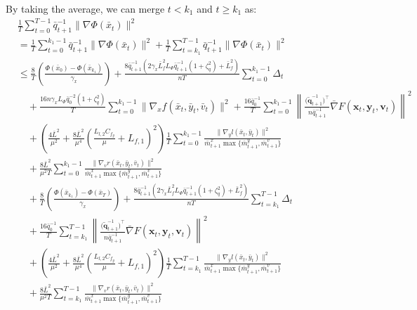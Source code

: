 \documentclass{article}
\theoremstyle{plain}
\theoremstyle{definition}
\theoremstyle{remark}
\begin{document}
By taking the average, we can merge $t < k_1$ and $t \geq k_1$ as:
\begin{align}
&\frac{1}{T} \sum_{t=0}^{T-1} { \bar{q}_{t+1}^{-1}}\|\nabla \Phi(\bar{x}_t)\|^2\nonumber\\
&= \frac{1}{T} \sum_{t=0}^{k_1-1} {\bar{q}_{t+1}^{-1}}\|\nabla \Phi(\bar{x}_t)\|^2
+ \frac{1}{T} \sum_{t=k_1}^{T-1} {\bar{q}_{t+1}^{-1}}\|\nabla \Phi(\bar{x}_t)\|^2\nonumber \\
&\leq \frac{8}{T}\left(\frac{\Phi(\bar{x}_0)-\Phi(\bar{x}_{k_1})}{\gamma_x}\right)+\frac{8\bar{q}_{t+1}^{-1}(2\gamma_x \bar{L}_{f}^2L_\Phi \bar{q}_{t+1}^{-1} \left(1 +\zeta_q^2\right)+\bar{L}_{f}^2)}{nT} \sum_{t=0}^{k_1-1}\Delta_t\nonumber\\
&\quad +\frac{16n\gamma_x L_\Phi \bar{q}_{0}^{-2} \left(1 +\zeta_q^2\right)}{T}\sum_{t=0}^{k_1-1}\|\nabla_x f(\bar{x}_t, \bar{y}_t, \bar{v}_t)\|^2
+ \frac{16\bar{q}_{0}^{-1}}{T}\sum_{t=0}^{k_1-1} \left\| \frac{\big(\tilde{\mathbf{q}}_{t+1}^{-1}\big)^\top}{n\bar{q}_{t+1}^{-1}} \bar{\nabla} F(\mathbf{x}_t, \mathbf{y}_t, \mathbf{v}_t) \right\|^2 \nonumber \\
&\quad +\left( \frac{4\bar{L}^2}{\mu^2} + \frac{8\bar{L}^2}{\mu^4} \left( \frac{L_{l,2} C_{f_y}}{\mu} + L_{f,1} \right)^2 \right) \frac{1}{T}\sum_{t=0}^{k_1-1}\frac{\|\nabla_y l(\bar{x}_t, \bar{y}_t)\|^2}{\bar{m}^x_{t+1}\max\{\bar{m}^y_{t+1},\bar{m}^v_{t+1}\}}\nonumber\\
&\quad+ \frac{8\bar{L}^2 }{\mu^2T}\sum_{t=0}^{k_1-1}\frac{\|\nabla_v r(\bar{x}_t, \bar{y}_t, \bar{v}_t)\|^2}{\bar{m}^x_{t+1}\max\{\bar{m}^y_{t+1},\bar{m}^v_{t+1}\}}\nonumber\\
&\quad+ \frac{8}{T}\left(\frac{\Phi(\bar{x}_{k_1})-\Phi(\bar{x}_{T})}{\gamma_x}\right)+\frac{8\bar{q}_{t+1}^{-1}(2\gamma_x \bar{L}_{f}^2L_\Phi \bar{q}_{t+1}^{-1} \left(1 +\zeta_q^2\right)+\bar{L}_{f}^2)}{nT} \sum_{t=k_1}^{T-1} \Delta_t\nonumber\\
&\quad + \frac{16 \bar{q}_{0}^{-1}}{T}\sum_{t=k_1}^{T-1}  \left\| \frac{\big(\tilde{\mathbf{q}}_{t+1}^{-1}\big)^\top}{n\bar{q}_{t+1}^{-1}} \bar{\nabla} F(\mathbf{x}_t, \mathbf{y}_t, \mathbf{v}_t) \right\|^2 \nonumber \\
&\quad +\left( \frac{4\bar{L}^2}{\mu^2} + \frac{8\bar{L}^2}{\mu^4} \left( \frac{L_{l,2} C_{f_y}}{\mu} + L_{f,1} \right)^2 \right) \frac{1}{T}\sum_{t=k_1}^{T-1} \frac{\|\nabla_y l(\bar{x}_t, \bar{y}_t)\|^2}{\bar{m}^x_{t+1}\max\{\bar{m}^y_{t+1},\bar{m}^v_{t+1}\}}\nonumber\\
&\quad+ \frac{8\bar{L}^2 }{\mu^2T}\sum_{t=k_1}^{T-1} \frac{\|\nabla_v r(\bar{x}_t, \bar{y}_t, \bar{v}_t)\|^2}{\bar{m}^x_{t+1}\max\{\bar{m}^y_{t+1},\bar{m}^v_{t+1}\}}\nonumber\\

\end{align}
\end{document}
